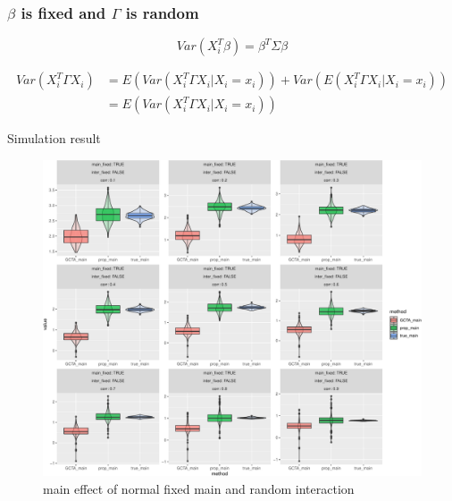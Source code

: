 \documentclass[]{article}
\begin{document}
\clearpage

\subsubsection{\texorpdfstring{\(\beta\) is fixed and \(\Gamma\) is
random}{\textbackslash{}beta is fixed and \textbackslash{}Gamma is random}}\label{beta-is-fixed-and-gamma-is-random}

\[
    Var(X_i^T\beta) = \beta^T \Sigma \beta
\]

\begin{align*}
    Var(X_i^T\Gamma X_i) &= E(Var(X_i^T\Gamma X_i|X_i = x_i)) + Var(E(X_i^T\Gamma X_i|X_i = x_i)) \\ 
                         &= E(Var(X_i^T\Gamma X_i|X_i = x_i))
\end{align*}

Simulation result

\begin{figure}
\centering
\includegraphics{Simulation_report_files/figure-latex/main_fixed_random_normal-1.pdf}
\caption{main effect of normal fixed main and random interaction}
\end{figure}
\end{document}
